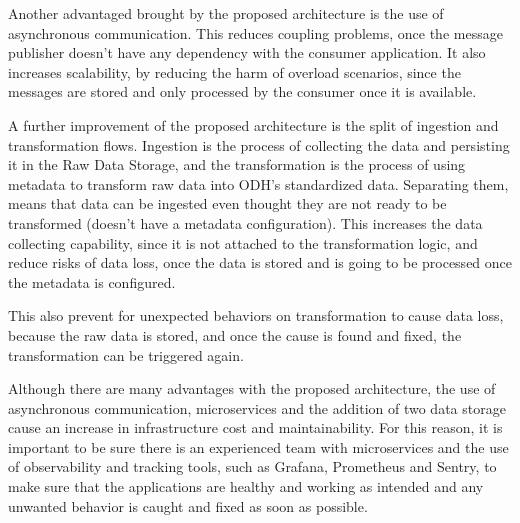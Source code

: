 Another advantaged brought by the proposed architecture is the use of asynchronous communication. This reduces coupling problems, once the message publisher doesn't have any dependency with the consumer application. It also increases scalability, by reducing the harm of overload scenarios, since the messages are stored and only processed by the consumer once it is available.

A further improvement of the proposed architecture is the split of ingestion and transformation flows. Ingestion is the process of collecting the data and persisting it in the Raw Data Storage, and the transformation is the process of using metadata to transform raw data into ODH's standardized data. Separating them, means that data can be ingested even thought they are not ready to be transformed (doesn't have a metadata configuration). This increases the data collecting capability, since it is not attached to the transformation logic, and reduce risks of data loss, once the data is stored and is going to be processed once the metadata is configured.

This also prevent for unexpected behaviors on transformation to cause data loss, because the raw data is stored, and once the cause is found and fixed, the transformation can be triggered again.

Although there are many advantages with the proposed architecture, the use of asynchronous communication, microservices and the addition of two data storage cause an increase in infrastructure cost and maintainability. For this reason, it is important to be sure there is an experienced team with microservices and the use of observability and tracking tools, such as Grafana, Prometheus and Sentry, to make sure that the applications are healthy and working as intended and any unwanted behavior is caught and fixed as soon as possible.
